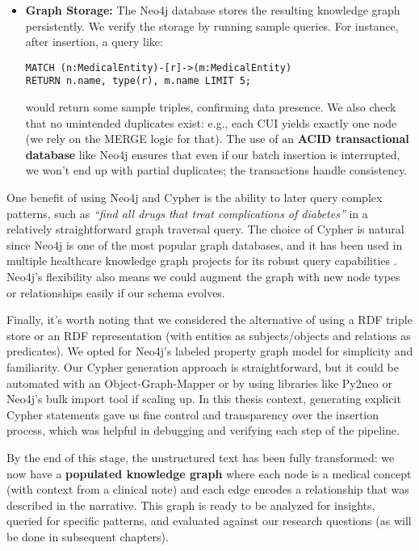 \begin{itemize}
\item \textbf{Graph Storage:} The Neo4j database stores the resulting knowledge graph persistently. We verify the storage by running sample queries. For instance, after insertion, a query like:

\begin{verbatim}
MATCH (n:MedicalEntity)-[r]->(m:MedicalEntity) 
RETURN n.name, type(r), m.name LIMIT 5;
\end{verbatim}

  would return some sample triples, confirming data presence. We also check that no unintended duplicates exist: e.g., each CUI yields exactly one node (we rely on the MERGE logic for that). The use of an \textbf{ACID transactional database} like Neo4j ensures that even if our batch insertion is interrupted, we won't end up with partial duplicates; the transactions handle consistency.
\end{itemize}

One benefit of using Neo4j and Cypher is the ability to later query complex patterns, such as \textit{``find all drugs that treat complications of diabetes''} in a relatively straightforward graph traversal query. The choice of Cypher is natural since Neo4j is one of the most popular graph databases, and it has been used in multiple healthcare knowledge graph projects for its robust query capabilities \parencite{Neo4j2023}. Neo4j's flexibility also means we could augment the graph with new node types or relationships easily if our schema evolves.

Finally, it's worth noting that we considered the alternative of using a RDF triple store or an RDF representation (with entities as subjects/objects and relations as predicates). We opted for Neo4j's labeled property graph model for simplicity and familiarity. Our Cypher generation approach is straightforward, but it could be automated with an Object-Graph-Mapper or by using libraries like Py2neo or Neo4j's bulk import tool if scaling up. In this thesis context, generating explicit Cypher statements gave us fine control and transparency over the insertion process, which was helpful in debugging and verifying each step of the pipeline.

By the end of this stage, the unstructured text has been fully transformed: we now have a \textbf{populated knowledge graph} where each node is a medical concept (with context from a clinical note) and each edge encodes a relationship that was described in the narrative. This graph is ready to be analyzed for insights, queried for specific patterns, and evaluated against our research questions (as will be done in subsequent chapters).

